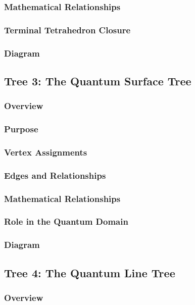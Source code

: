 \documentclass[12pt]{article}
\begin{document}
\subsubsection{Mathematical Relationships}
\subsubsection{Terminal Tetrahedron Closure}
\subsubsection{Diagram}

\subsection{Tree 3: The Quantum Surface Tree}
\subsubsection{Overview}
\subsubsection{Purpose}
\subsubsection{Vertex Assignments}
\subsubsection{Edges and Relationships}
\subsubsection{Mathematical Relationships}
\subsubsection{Role in the Quantum Domain}
\subsubsection{Diagram}

\subsection{Tree 4: The Quantum Line Tree}
\subsubsection{Overview}
\end{document}
